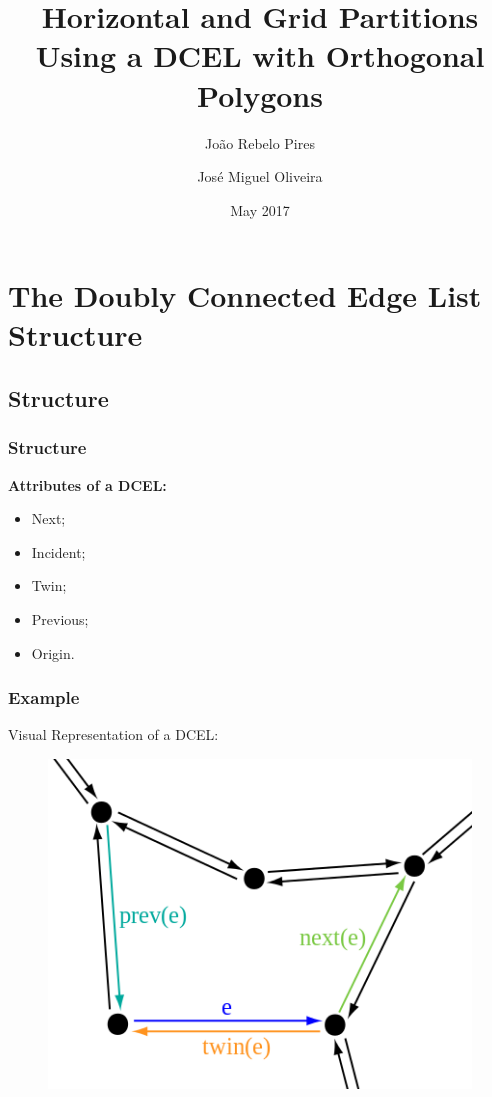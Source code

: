 \documentclass{beamer}
\title[Horizontal and Grid Partitions]{Horizontal and Grid Partitions\\Using a DCEL with Orthogonal Polygons}
\author[João Pires, José Oliveira, DCC/FCUP]{João Rebelo Pires \and José Miguel Oliveira}
\institute[DCC/FCUP]{Departamento de Ciência de Computadores, FCUP}
\date{May 2017}
\begin{document}
\begin{frame}
\maketitle
\end{frame}

\section{The Doubly Connected Edge List Structure}
\subsection{Structure}
\begin{frame}
\frametitle{Structure}
\textbf{Attributes of a DCEL:}
\pause
\begin{itemize}[<+->]
  \item Next;
  \item Incident;
  \item Twin;
  \item Previous;
  \item Origin.
\end{itemize}
\end{frame}

\begin{frame}
\frametitle{Example}
\begin{block}{Visual Representation of a DCEL:}
	\begin{figure}
		\includegraphics[scale=0.5]{images/dcel}
	\end{figure}
\end{block}

\end{frame}
\end{document}
